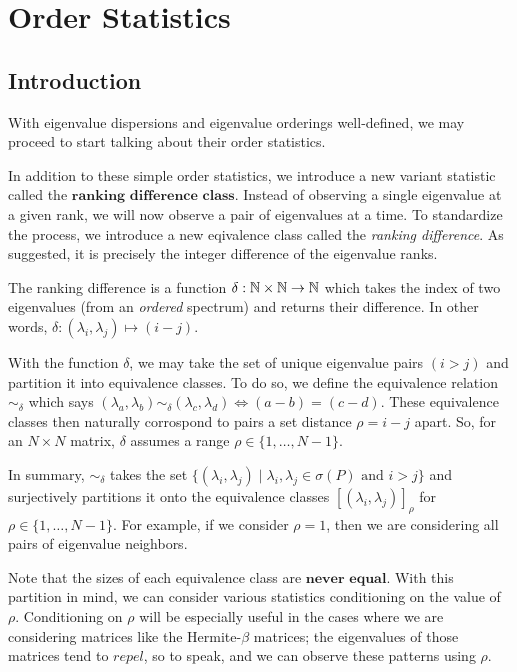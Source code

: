 
\section{Order Statistics}
\subsection{Introduction}
With eigenvalue dispersions and eigenvalue orderings well-defined, we may proceed to start talking about their order statistics. 

In addition to these simple order statistics, we introduce a new variant statistic called the $\textbf{ranking difference class}$. Instead of observing a single eigenvalue at a given rank, we will now observe a pair of eigenvalues at a time. To standardize the process, we introduce a new eqivalence class called the \textit{ranking difference}. As suggested, it is precisely the integer difference of the eigenvalue ranks.

\begin{definition}
The ranking difference is a function $\delta: \mathbb{N} \times \mathbb{N} \to \mathbb{N}$ which takes the index of two eigenvalues (from an \textit{ordered} spectrum) and returns their difference. In other words, $\delta : (\lambda_i,\lambda_j) \mapsto (i - j)$.
\end{definition}

With the function $\delta$, we may take the set of unique eigenvalue pairs $(i > j)$ and partition it into equivalence classes. To do so, we define the equivalence relation $\sim_\delta$ which says $(\lambda_a,\lambda_b) \sim_\delta (\lambda_c,\lambda_d) \iff (a -b) = (c-d)$. These equivalence classes then naturally corrospond to pairs a set distance $\rho = i - j$ apart. So, for an $N \times N$ matrix, $\delta$ assumes a range $\rho \in \{ 1,\dots,N-1\}$.

In summary, $\sim_\delta$ takes the set $\{(\lambda_i, \lambda_j) \mid \lambda_i, \lambda_j \in \sigma(P) \text{ and } i > j \}$ and surjectively partitions it onto the equivalence classes $[(\lambda_i, \lambda_j)]_\rho$ for $\rho \in \{ 1,\dots,N-1\}$. For example, if we consider $\rho = 1$, then we are considering all pairs of eigenvalue neighbors.

Note that the sizes of each equivalence class are $\textbf{never equal}$. With this partition in mind, we can consider various statistics conditioning on the value of $\rho$. Conditioning on $\rho$ will be especially useful in the cases where we are considering matrices like the Hermite-$\beta$ matrices; the eigenvalues of those matrices tend to $\textit{repel}$, so to speak, and we can observe these patterns using $\rho$.


